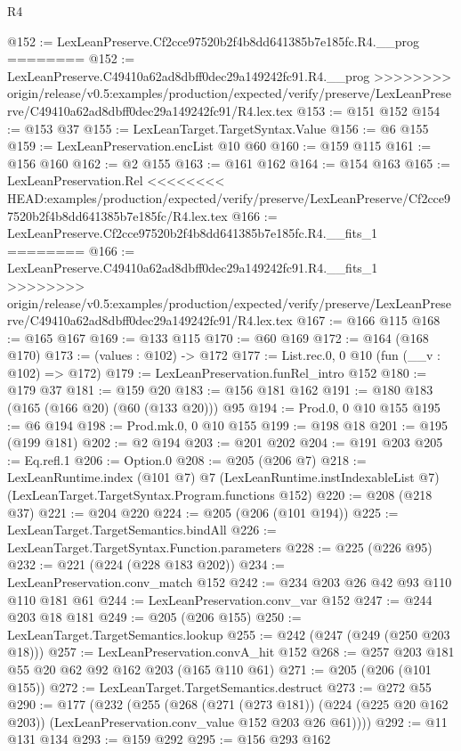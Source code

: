 \begin{lexlean}{R4}
\begin{coremodule}
{{{{{{{{@152 := LexLeanPreserve.Cf2cce97520b2f4b8dd641385b7e185fc.R4.__prog
========
@152 := LexLeanPreserve.C49410a62ad8dbff0dec29a149242fc91.R4.__prog
>>>>>>>> origin/release/v0.5:examples/production/expected/verify/preserve/LexLeanPreserve/C49410a62ad8dbff0dec29a149242fc91/R4.lex.tex
@153 := @151 @152
@154 := @153 @37
@155 := LexLeanTarget.TargetSyntax.Value
@156 := @6 @155
@159 := LexLeanPreservation.encList @10 @60
@160 := @159 @115
@161 := @156 @160
@162 := @2 @155
@163 := @161 @162
@164 := @154 @163
@165 := LexLeanPreservation.Rel
<<<<<<<< HEAD:examples/production/expected/verify/preserve/LexLeanPreserve/Cf2cce97520b2f4b8dd641385b7e185fc/R4.lex.tex
@166 := LexLeanPreserve.Cf2cce97520b2f4b8dd641385b7e185fc.R4.__fits_1
========
@166 := LexLeanPreserve.C49410a62ad8dbff0dec29a149242fc91.R4.__fits_1
>>>>>>>> origin/release/v0.5:examples/production/expected/verify/preserve/LexLeanPreserve/C49410a62ad8dbff0dec29a149242fc91/R4.lex.tex
@167 := @166 @115
@168 := @165 @167
@169 := @133 @115
@170 := @60 @169
@172 := @164 (@168 @170)
@173 := (values : @102) -> @172
@177 := List.rec.{0, 0} @10 (fun (__v : @102) => @172)
@179 := LexLeanPreservation.funRel_intro @152
@180 := @179 @37
@181 := @159 @20
@183 := @156 @181 @162
@191 := @180 @183 (@165 (@166 @20) (@60 (@133 @20))) @95
@194 := Prod.{0, 0} @10 @155
@195 := @6 @194
@198 := Prod.mk.{0, 0} @10 @155
@199 := @198 @18
@201 := @195 (@199 @181)
@202 := @2 @194
@203 := @201 @202
@204 := @191 @203
@205 := Eq.refl.{1}
@206 := Option.{0}
@208 := @205 (@206 @7)
@218 := LexLeanRuntime.index
    (@101 @7)
    @7
    (LexLeanRuntime.instIndexableList @7)
    (LexLeanTarget.TargetSyntax.Program.functions @152)
@220 := @208 (@218 @37)
@221 := @204 @220
@224 := @205 (@206 (@101 @194))
@225 := LexLeanTarget.TargetSemantics.bindAll
@226 := LexLeanTarget.TargetSyntax.Function.parameters
@228 := @225 (@226 @95)
@232 := @221 (@224 (@228 @183 @202))
@234 := LexLeanPreservation.conv_match @152
@242 := @234 @203 @26 @42 @93 @110 @110 @181 @61
@244 := LexLeanPreservation.conv_var @152
@247 := @244 @203 @18 @181
@249 := @205 (@206 @155)
@250 := LexLeanTarget.TargetSemantics.lookup
@255 := @242 (@247 (@249 (@250 @203 @18)))
@257 := LexLeanPreservation.convA_hit @152
@268 := @257 @203 @181 @55 @20 @62 @92 @162 @203 (@165 @110 @61)
@271 := @205 (@206 (@101 @155))
@272 := LexLeanTarget.TargetSemantics.destruct
@273 := @272 @55
@290 := @177
    (@232
      (@255
        (@268
          (@271 (@273 @181))
          (@224 (@225 @20 @162 @203))
          (LexLeanPreservation.conv_value @152 @203 @26 @61))))
@292 := @11 @131 @134
@293 := @159 @292
@295 := @156 @293 @162
}}}}}}}}
\end{coremodule}
\end{lexlean}
